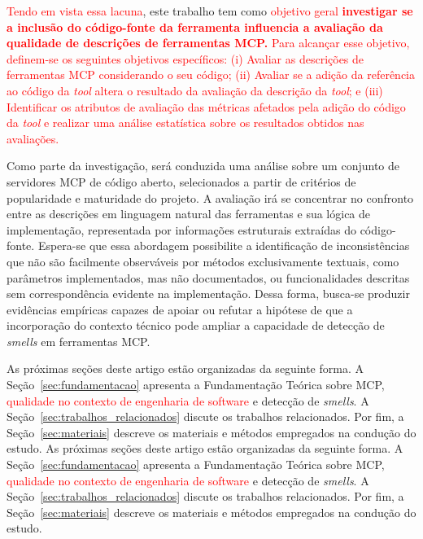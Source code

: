 \textcolor{red}{Tendo em vista essa lacuna}, este trabalho tem como \textcolor{red}{objetivo geral \textbf{investigar se a inclusão do código-fonte da ferramenta influencia a avaliação da qualidade de descrições de ferramentas MCP.} Para alcançar esse objetivo, definem-se os seguintes objetivos específicos: (i) Avaliar as descrições de ferramentas MCP considerando o seu código; (ii) Avaliar se a adição da referência ao código da \textit{tool} altera o resultado da avaliação da descrição da \textit{tool}; e (iii) Identificar os atributos de avaliação das métricas afetados pela adição do código da \textit{tool} e realizar uma análise estatística sobre os resultados obtidos nas avaliações.}

Como parte da investigação, será conduzida uma análise sobre um conjunto de servidores MCP de código aberto, selecionados a partir de critérios de popularidade e maturidade do projeto. A avaliação irá se concentrar no confronto entre as descrições em linguagem natural das ferramentas e sua lógica de implementação, representada por informações estruturais extraídas do código-fonte. Espera-se que essa abordagem possibilite a identificação de inconsistências que não são facilmente observáveis por métodos exclusivamente textuais, como parâmetros implementados, mas não documentados, ou funcionalidades descritas sem correspondência evidente na implementação. Dessa forma, busca-se produzir evidências empíricas capazes de apoiar ou refutar a hipótese de que a incorporação do contexto técnico pode ampliar a capacidade de detecção de \textit{smells} em ferramentas MCP.

As próximas seções deste artigo estão organizadas da seguinte forma. A Seção~\ref{sec:fundamentacao} apresenta a Fundamentação Teórica sobre MCP, \textcolor{red}{qualidade no contexto de engenharia de software} e detecção de \textit{smells}. A Seção~\ref{sec:trabalhos_relacionados} discute os trabalhos relacionados. Por fim, a Seção~\ref{sec:materiais} descreve os materiais e métodos empregados na condução do estudo.
As próximas seções deste artigo estão organizadas da seguinte forma. A Seção~\ref{sec:fundamentacao} apresenta a Fundamentação Teórica sobre MCP, \textcolor{red}{qualidade no contexto de engenharia de software} e detecção de \textit{smells}. A Seção~\ref{sec:trabalhos_relacionados} discute os trabalhos relacionados. Por fim, a Seção~\ref{sec:materiais} descreve os materiais e métodos empregados na condução do estudo.